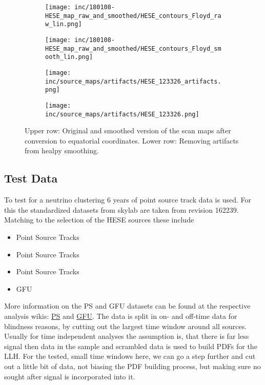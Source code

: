 \begin{figure}[h] %
  \centering
  \begin{subfigure}[c]{0.49\textwidth}
    \texttt{[image: inc/180108-HESE\_map\_raw\_and\_smoothed/HESE\_contours\_Floyd\_raw\_lin.png]}
  \end{subfigure}
  \hfill
  \begin{subfigure}[c]{0.49\textwidth}
    \texttt{[image: inc/180108-HESE\_map\_raw\_and\_smoothed/HESE\_contours\_Floyd\_smooth\_lin.png]}
  \end{subfigure}

  \begin{subfigure}[c]{0.49\textwidth}
    \texttt{[image: inc/source\_maps/artifacts/HESE\_123326\_artifacts.png]}
  \end{subfigure}
  \hfill
  \begin{subfigure}[c]{0.49\textwidth}
    \texttt{[image: inc/source\_maps/artifacts/HESE\_123326.png]}
  \end{subfigure}

  \caption{Upper row: Original and smoothed version of the scan maps after conversion to equatorial coordinates. Lower row: Removing artifacts from healpy smoothing.}
  \label{fig:source_map_handling}
\end{figure}


\subsection{Test Data}
To test for a neutrino clustering 6 years of point source track data is used.
For this the standardized datasets from skylab are taken from revision 162239.
Matching to the selection of the HESE sources these include
\begin{itemize}
  \item Point Source Tracks 
  \item Point Source Tracks 
  \item Point Source Tracks 
  \item GFU 
\end{itemize}
More information on the PS and GFU datasets can be found at the respective analysis wikis: \href{https://icecube.wisc.edu/~coenders/html/build/html/ic86-bdt/muonL3.html}{PS} and \href{https://icecube.wisc.edu/~tkintscher/internal/gfu_doc/eventselection.html}{GFU}.
The data is split in on- and off-time data for blindness reasons, by cutting out the largest time window around all sources.
Usually for time independent analyses the assumption is, that there is far less signal then data in the sample and scrambled data is used to build PDFs for the LLH.
For the tested, small time windows here, we can go a step further and cut out a little bit of data, not biasing the PDF building process, but making sure no sought after signal is incorporated into it.

